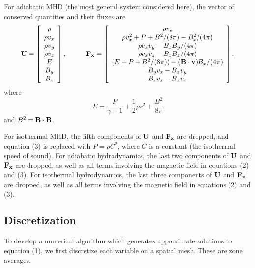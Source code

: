For adiabatic MHD (the most general system considered here),
the vector of conserved quantities and their fluxes are
\begin{equation}
{\bf U}  = \left[ \begin{array}{c}
  \rho \\
  \rho v_{x} \\
  \rho v_{y} \\
  \rho v_{z} \\
   E \\
   B_{y} \\
   B_{z} \\ \end{array} \right] , \hspace{1cm}
{\bf F_{x}} = \left[ \begin{array}{c}
  \rho v_{x} \\
  \rho v_{x}^{2} + P + B^{2}/(8\pi) - B_{x}^{2}/(4\pi) \\
  \rho v_{x}v_{y} - B_{x}B_{y}/(4\pi) \\
  \rho v_{x}v_{z} - B_{x}B_{z}/(4\pi) \\
  (E + P + B^{2}/(8\pi)) - ({\bf B}\cdot{\bf v})B_{x}/(4\pi) \\
  B_{y}v_{x} - B_{x}v_{y} \\
  B_{z}v_{x} - B_{x}v_{z} \end{array} \right].
\end{equation}
where
\begin{equation}
  E = \frac{P}{\gamma -1} + \frac{1}{2}\rho v^{2} + \frac{B^{2}}{8\pi}
\end{equation}
and $B^{2} = {\bf B} \cdot {\bf B}$.

For isothermal MHD, the fifth components of ${\bf U}$ and ${\bf F_{x}}$
are dropped, and equation (3) is replaced with $P=\rho C^{2}$, where
$C$ is a constant (the isothermal speed of sound).  For adiabatic
hydrodynamics, the last two components of ${\bf U}$ and ${\bf F_{x}}$
are dropped, as well as all terms involving the magnetic field in
equations (2) and (3).  For isothermal hydrodynamics, the last three
components of ${\bf U}$ and ${\bf F_{x}}$ are dropped, as well as all
terms involving the magnetic field in equations (2) and (3).

\subsection{Discretization}

To develop a numerical algorithm which generates approximate solutions to
equation (1), we first discretize each variable on a spatial mesh.
These are zone averages.

